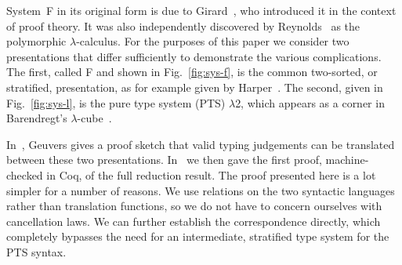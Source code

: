 \documentclass[a4paper,UKenglish]{lipics-v2016}
\newcommand{\SysL}{$\lambda$2\xspace}
\theoremstyle{plain}
\begin{document}
System~F in its original form is due to Girard~\cite{Girard1972, Girard1989}, who introduced it in the context of proof theory.
It was also independently discovered by Reynolds~\cite{DBLP:conf/programm/Reynolds74} as the polymorphic $\lambda$-calculus.
For the purposes of this paper we consider two presentations that differ sufficiently to demonstrate the various complications.
The first, called F and shown in Fig.~\ref{fig:sys-f}, is the common two-sorted, or stratified, presentation, as for example given by Harper~\cite{Harper2013}.
The second, given in Fig.~\ref{fig:sys-l}, is the pure type system (PTS) \SysL, which appears as a corner in Barendregt's $\lambda$-cube~\cite{DBLP:journals/jfp/Barendregt91}.

In~\cite{Geuvers1993}, Geuvers gives a proof sketch that valid typing judgements can be translated between these two presentations.
In~\cite{KaiserEtAl:2017:sysf_pts_equiv_coq} we then gave the first proof, machine-checked in Coq, of the full reduction result.
The proof presented here is a lot simpler for a number of reasons.
We use relations on the two syntactic languages rather than translation functions, so we do not have to concern ourselves with cancellation laws.
We can further establish the correspondence directly, which completely bypasses the need for an intermediate, stratified type system for the PTS syntax.
\end{document}
